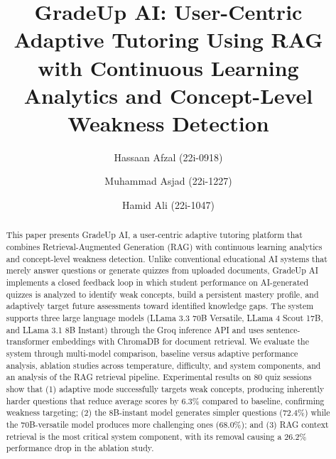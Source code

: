 \documentclass[runningheads]{llncs}
\begin{document}
\title{GradeUp AI: User-Centric Adaptive Tutoring Using RAG with Continuous Learning Analytics and Concept-Level Weakness Detection}

\author{Hassaan Afzal (22i-0918) \and Muhammad Asjad (22i-1227) \and Hamid Ali (22i-1047)}



\maketitle

\begin{abstract}
This paper presents GradeUp AI, a user-centric adaptive tutoring platform that combines Retrieval-Augmented Generation (RAG) with continuous learning analytics and concept-level weakness detection. Unlike conventional educational AI systems that merely answer questions or generate quizzes from uploaded documents, GradeUp AI implements a closed feedback loop in which student performance on AI-generated quizzes is analyzed to identify weak concepts, build a persistent mastery profile, and adaptively target future assessments toward identified knowledge gaps. The system supports three large language models (LLama 3.3 70B Versatile, LLama 4 Scout 17B, and LLama 3.1 8B Instant) through the Groq inference API and uses sentence-transformer embeddings with ChromaDB for document retrieval. We evaluate the system through multi-model comparison, baseline versus adaptive performance analysis, ablation studies across temperature, difficulty, and system components, and an analysis of the RAG retrieval pipeline. Experimental results on 80 quiz sessions show that (1) adaptive mode successfully targets weak concepts, producing inherently harder questions that reduce average scores by 6.3\% compared to baseline, confirming weakness targeting; (2) the 8B-instant model generates simpler questions (72.4\%) while the 70B-versatile model produces more challenging ones (68.0\%); and (3) RAG context retrieval is the most critical system component, with its removal causing a 26.2\% performance drop in the ablation study.

\end{abstract}
\end{document}
